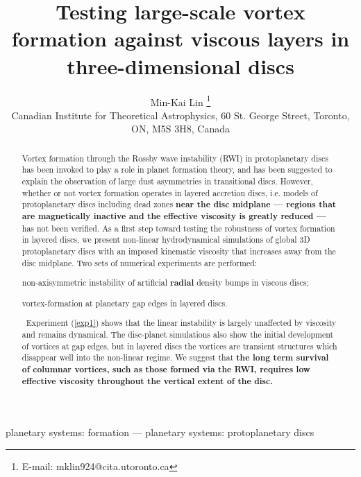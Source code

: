 \documentclass[useAMS,usenatbib]{mn2e}
\title[Vortices in viscous discs]{Testing large-scale 
  vortex formation against viscous layers in three-dimensional discs}
\author[Lin]{Min-Kai Lin%
  \thanks{E-mail: mklin924@cita.utoronto.ca} \\%
Canadian Institute for Theoretical Astrophysics,
  60 St. George Street, Toronto, ON, M5S 3H8, Canada %
}
\begin{document}
\maketitle
\begin{abstract}
  Vortex formation through the Rossby wave 
  instability (RWI) in protoplanetary discs has been invoked to play a
  role in planet formation theory, and has been suggested to explain
  the observation of large dust asymmetries in transitional discs.   
  However, whether or not vortex formation operates in layered
  accretion discs, i.e. models of protoplanetary discs including dead
  zones {\bf near the disc midplane --- regions that are magnetically
    inactive and the effective viscosity is greatly reduced ---}   
  has not been verified. As a first step toward testing the robustness of
  vortex formation in layered discs, we present 
  non-linear hydrodynamical 
  simulations of global 3D protoplanetary discs with an imposed kinematic
  viscosity that increases away from the disc midplane. Two sets of numerical 
  experiments are performed:
  \begin{inparaenum}[(i)]
  \item non-axisymmetric instability of artificial
    {\bf radial} density bumps in viscous discs;\label{exp1}  
  \item vortex-formation at planetary gap edges in layered discs.%
  \end{inparaenum}\,
   Experiment (\ref{exp1}) shows that the linear instability is
   largely unaffected by viscosity and remains dynamical.   
   The disc-planet simulations  
   also show the initial development of vortices at gap edges, but in
   layered discs the vortices are transient structures which disappear  
   well into the non-linear regime. We suggest that {\bf the long term
     survival of columnar vortices, such as those formed via the RWI,
     requires low effective viscosity throughout the vertical extent
     of the disc. 
   }
%
\end{abstract}

\begin{keywords}
planetary systems: formation --- planetary systems:
protoplanetary discs
\end{keywords}
\end{document}
